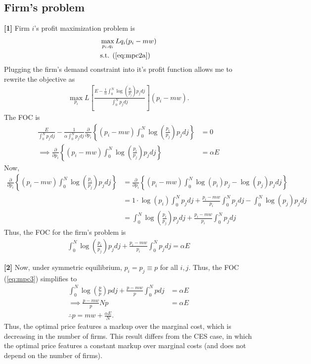 \documentclass[12pt]{article}
\begin{document}
\subsection{Firm's problem}
\textbf{[1] }Firm $i$'s profit maximization problem is
\begin{align*}
&\max_{p_i,q_i} Lq_i(p_i - mw)\\
& \text{s.t. (\ref{eq:mpc2a})}
\end{align*}
Plugging the firm's demand constraint into it's profit function allows me to rewrite the objective as
\begin{align*}
\max_{p_i} L \left[ \frac{E - \frac{1}{\alpha}\int_0^N \log\left(\frac{p_i}{p_j}\right)p_j dj}{\int_0^Np_j dj}\right](p_i - mw).
\end{align*}
The FOC is
\begin{align*}
\frac{E}{\int_0^Np_j dj} - \frac{1}{\alpha \int_0^Np_j dj} \frac{\partial}{\partial p_i}\left\{(p_i - mw)\int_0^N \log\left(\frac{p_i}{p_j}\right)p_j dj \right\} &=0\\
\implies \frac{\partial}{\partial p_i}\left\{(p_i - mw)\int_0^N \log\left(\frac{p_i}{p_j}\right)p_j dj \right\} &=\alpha E
\end{align*}
Now,
\begin{align*}
\frac{\partial}{\partial p_i}\left\{(p_i - mw)\int_0^N \log\left(\frac{p_i}{p_j}\right)p_j dj \right\} &=\frac{\partial}{\partial p_i}\left\{(p_i - mw)\int_0^N \log(p_i) p_j -\log (p_j)p_j dj \right\}\\
&= 1\cdot \log(p_i) \int_0^N  p_j dj + \frac{p_i - mw}{p_i}\int_0^N  p_j dj -\int_0^N \log (p_j)p_j dj\\
&=\int_0^N \log\left(\frac{p_i}{p_j}\right)p_j dj + \frac{p_i - mw}{p_i}\int_0^N  p_j dj
\end{align*}
Thus, the FOC for the firm's problem is
\begin{align}
\int_0^N \log\left(\frac{p_i}{p_j}\right)p_j dj + \frac{p_i - mw}{p_i}\int_0^N  p_j dj = \alpha E \label{eq:mpc3}
\end{align}

\textbf{[2]} Now, under symmetric equilibrium, $p_i = p_j \equiv p$ for all $i,j$. Thus, the FOC (\ref{eq:mpc3}) simplifies to
\begin{align}
\int_0^N \log\left(\frac{p}{p}\right)p dj + \frac{p - mw}{p}\int_0^N  p dj &= \alpha E \nonumber\\
\implies \frac{p - mw}{p} Np &= \alpha E\nonumber\\
\therefore p = mw + \frac{\alpha E}{N} \label{eq:mpc4}.
\end{align}
Thus, the optimal price features a markup over the marginal cost, which is decreasing in the number of firms. This result differs from the CES case, in which the optimal price features a constant markup over marginal costs (and does not depend on the number of firms).\\
\end{document}

